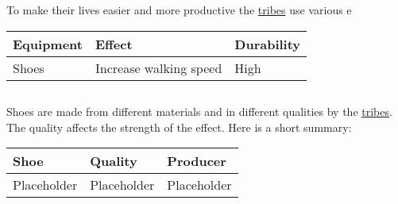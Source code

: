 \section{}\label{ch:Goods:Equipment} %
To make their lives easier and more productive the \hyperref[ch:Tribes]{tribes} use various e
\begin{longtable}{lll}
	\toprule
	\Gls*{Equipment} & Effect                 & Durability \\
	\midrule
	\Glspl{Shoe}     & Increase walking speed & High       \\
	\bottomrule
\end{longtable}

\subsection{}
\Glspl{Shoe} are made from different materials and in different qualities by the
\hyperref[ch:Tribes]{tribes}. The quality affects the strength of the effect. Here is a short summary:

\begin{longtable}{lll}
	\toprule
	\Gls*{Shoe} & Quality     & Producer    \\
	\midrule
	Placeholder & Placeholder & Placeholder \\
	\bottomrule
\end{longtable}
